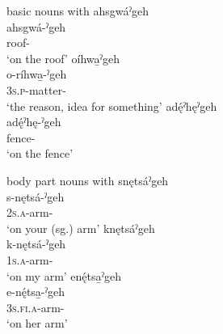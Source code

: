 \ea\label{ex:locex} basic nouns with 
\ea ahsgwáˀgeh\\
\gll ahsgwá-ˀgeh\\
 roof-{\on}\\
\glt `on the roof'
\ex oíhwa̱ˀgeh\\
\gll o-ríhwa̱-ˀgeh\\
 \textsc{3s.p}-matter-{\on}\\
\glt `the reason, idea for something'
\ex adę́ˀhęˀgeh\\
\gll adę́ˀhę-ˀgeh\\
 fence-{\on}\\
\glt `on the fence'
\z
\z

\ea\label{ex:locex2} body part nouns with 
\ea snętsáˀgeh\\
\gll s-nętsá-ˀgeh\\
 \textsc{2s.a}-arm-{\on}\\
\glt `on your (sg.) arm'
\ex knętsáˀgeh\\
\gll k-nętsá-ˀgeh\\
 \textsc{1s.a}-arm-{\on}\\
\glt `on my arm'
\ex enę́tsa̱ˀgeh\\
\gll e-nę́tsa̱-ˀgeh\\
 \textsc{3s.fi.a}-arm-{\on}\\
\glt `on her arm'
\z
\z

